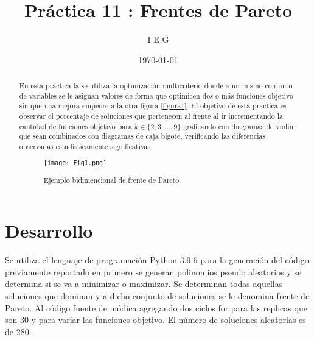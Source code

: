 \documentclass{article}
\author{I E G} %
\title{Práctica 11 : Frentes de Pareto} %
\date{\today}
\begin{document}

\maketitle %

\begin{abstract} %
En esta práctica la se utiliza la optimización multicriterio \cite{elis11} donde a un mismo conjunto de variables se le asignan valores de forma que optimicen dos o más funciones objetivo sin que una mejora empeore a la otra figura \ref{figura1}. El objetivo de esta practica es observar el porcentaje de soluciones que pertenecen al frente al ir incrementando la cantidad de funciones objetivo para $k \in \{2,3,\ldots,9\}$ graficando con diagramas de violín que sean combinados con diagramas de caja bigote, verificando las diferencias observadas estadísticamente significativas.



\begin{figure} [h!]%
    \centering
    \texttt{[image: Fig1.png]} %
    \caption{Ejemplo bidimencional de frente de Pareto.}
    \label{figura1}
\end{figure}

\end{abstract}


\section{Desarrollo}




Se utiliza el lenguaje de programación Python 3.9.6 para la generación del código previamente reportado en \cite{elis11,denis11} primero se generan polinomios pseudo aleatorios y se determina si se va a minimizar o maximizar. Se determinan todas aquellas soluciones que dominan y a dicho conjunto de soluciones se le denomina frente de Pareto. Al código fuente de módica agregando dos ciclos for para las replicas que son 30 y para variar las funciones objetivo. El número de soluciones aleatorias es de 280.
\end{document}
